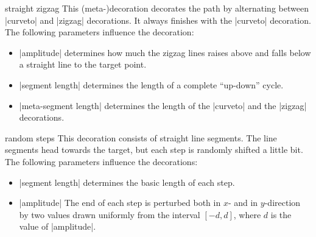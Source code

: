 \begin{decoration}{straight zigzag}
  This (meta-)decoration decorates the path by alternating between
  |curveto| and |zigzag| decorations. It always finishes
  with the |curveto| decoration. The following parameters influence
  the decoration:
  \begin{itemize}
  \item |amplitude|
    determines how much the zigzag lines raises above and falls below
    a straight line to the target point.
  \item |segment length|
    determines the length of a complete ``up-down'' cycle.
  \item	|meta-segment length|
    determines the length of the |curveto| and the |zigzag| decorations.
  \end{itemize}

\begin{codeexample}[]
\end{codeexample}
\end{decoration}


\begin{decoration}{random steps}
  This decoration consists of straight line segments. The line segments
  head towards the target, but each step is randomly shifted a little
  bit. The following parameters influence the decorations:
  \begin{itemize}
  \item |segment length|
    determines the basic length of each step.
  \item |amplitude|
    The end of each step is perturbed both in $x$- and in
    $y$-direction by two values drawn uniformly from the interval
    $[-d,d]$, where $d$ is the value of |amplitude|.
  \end{itemize}
\begin{codeexample}[]
\end{codeexample}
\end{decoration}


